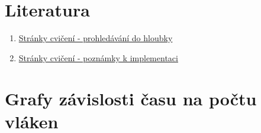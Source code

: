 \documentclass[12pt]{article}
\begin{document}
\section{Literatura}
\begin{enumerate}
\item \href{https://edux.fit.cvut.cz/courses/MI-PAR/labs/prohledavani_do_hloubky}{Stránky cvičení - prohledávání do hloubky}
\item \href{https://edux.fit.cvut.cz/courses/MI-PAR/labs/poznamky_k_implementaci}{Stránky cvičení - poznámky k implementaci}
\end{enumerate}


\appendix
\section{Grafy závislosti času na počtu vláken}
\end{document}
